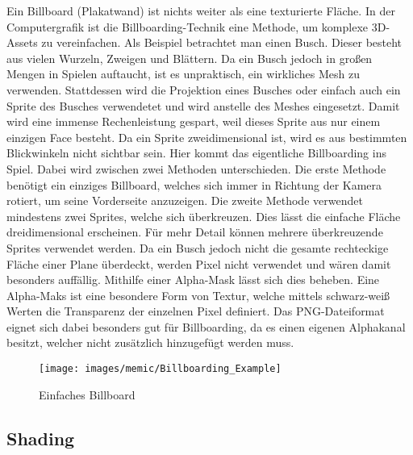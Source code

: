Ein Billboard (Plakatwand) ist nichts weiter als eine texturierte Fläche. In der Computergrafik ist die Billboarding-Technik eine Methode, um komplexe 3D-Assets zu vereinfachen. Als Beispiel betrachtet man einen Busch. Dieser besteht aus vielen Wurzeln, Zweigen und Blättern. Da ein Busch jedoch in großen Mengen in Spielen auftaucht, ist es unpraktisch, ein wirkliches Mesh zu verwenden. Stattdessen wird die Projektion eines Busches oder einfach auch ein Sprite des Busches verwendetet und wird anstelle des Meshes eingesetzt. Damit wird eine immense Rechenleistung gespart, weil dieses Sprite aus nur einem einzigen Face besteht.\cite[48]{_the_essential_guide_to_3D} Da ein Sprite zweidimensional ist, wird es aus bestimmten Blickwinkeln nicht sichtbar sein. Hier kommt das eigentliche Billboarding ins Spiel. Dabei wird zwischen zwei Methoden unterschieden.
Die erste Methode benötigt ein einziges Billboard, welches sich immer in Richtung der Kamera rotiert, um seine Vorderseite anzuzeigen.
Die zweite Methode verwendet mindestens zwei Sprites, welche sich überkreuzen. Dies lässt die einfache Fläche dreidimensional erscheinen. Für mehr Detail können mehrere überkreuzende Sprites verwendet werden.
Da ein Busch jedoch nicht die gesamte rechteckige Fläche einer Plane überdeckt, werden Pixel nicht verwendet und wären damit besonders auffällig. Mithilfe einer Alpha-Mask lässt sich dies beheben. Eine Alpha-Maks ist eine besondere Form von Textur, welche mittels schwarz-weiß Werten die Transparenz der einzelnen Pixel definiert. Das PNG-Dateiformat eignet sich dabei besonders gut für Billboarding, da es einen eigenen Alphakanal besitzt, welcher nicht zusätzlich hinzugefügt werden muss.

\begin{figure}[H]
	\centering
	\texttt{[image: images/memic/Billboarding\_Example]}
	\caption{Einfaches Billboard}
	\end{figure}

\subsection{Shading}

